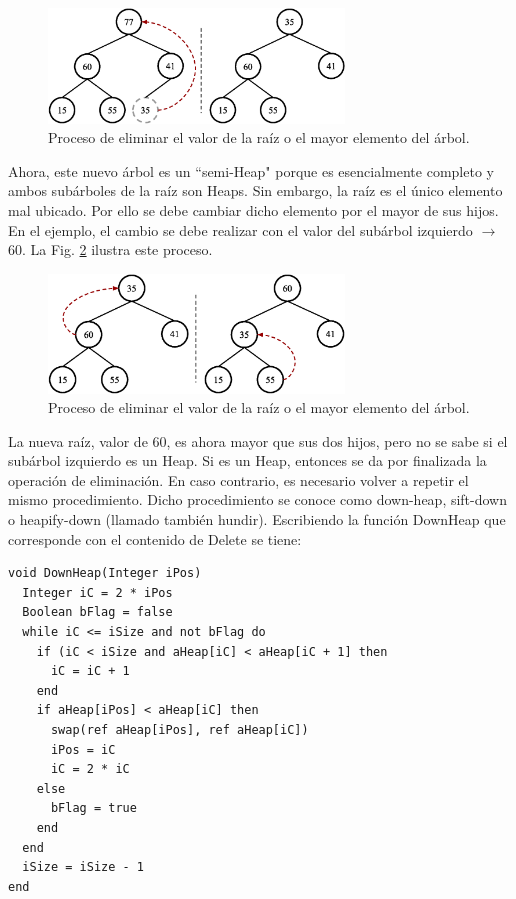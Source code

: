 \begin{figure}[htpb!]
  \begin{center}
    \includegraphics[width=0.7\textwidth]{images/heaptreedel1.eps}
  \end{center}
  \caption{Proceso de eliminar el valor de la raíz o el mayor elemento del árbol.}
  \label{fig:heaptreedel1}
\end{figure}

Ahora, este nuevo árbol es un ``semi-Heap" porque es esencialmente completo y ambos subárboles de la raíz son Heaps. Sin embargo, la raíz es el único elemento mal ubicado. Por ello se debe cambiar dicho elemento por el mayor de sus hijos. En el ejemplo, el cambio se debe realizar con el valor del subárbol izquierdo $\rightarrow$ 60. La Fig. \ref{fig:heaptreedel2} ilustra este proceso.

\begin{figure}[htpb!]
  \begin{center}
    \includegraphics[width=0.7\textwidth]{images/heaptreedel2.eps}
  \end{center}
  \caption{Proceso de eliminar el valor de la raíz o el mayor elemento del árbol.}
  \label{fig:heaptreedel2}
\end{figure}

La nueva raíz, valor de 60, es ahora mayor que sus dos hijos, pero no se sabe si el subárbol izquierdo es un Heap. Si es un Heap, entonces se da por finalizada la operación de eliminación. En caso contrario, es necesario volver a repetir el mismo procedimiento. Dicho procedimiento se conoce como down-heap, sift-down o heapify-down (llamado también hundir). Escribiendo la función DownHeap que corresponde con el contenido de Delete se tiene:

\begin{lstlisting}[upquote=true, language=pseudo]
void DownHeap(Integer iPos)
  Integer iC = 2 * iPos
  Boolean bFlag = false
  while iC <= iSize and not bFlag do
    if (iC < iSize and aHeap[iC] < aHeap[iC + 1] then
      iC = iC + 1
    end
    if aHeap[iPos] < aHeap[iC] then
      swap(ref aHeap[iPos], ref aHeap[iC])
      iPos = iC
      iC = 2 * iC
    else
      bFlag = true
    end
  end
  iSize = iSize - 1
end
\end{lstlisting}

